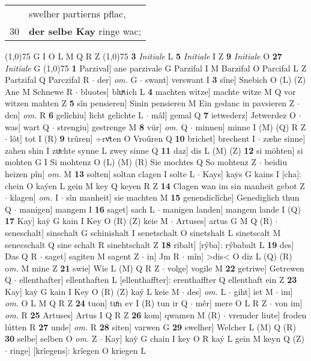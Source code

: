 \documentclass[8pt,a4paper,notitlepage]{article}
\begin{document}
\begin{table}[ht]
\begin{minipage}[t]{0.5\linewidth}
\begin{tabular}{rl}
 & swelher partierns pflac,\\ 
30 & \textbf{der selbe Kay} ringe wac;\\ 
\end{tabular}
\scriptsize
\line(1,0){75} \newline
G I O L M Q R Z \newline
\line(1,0){75} \newline
\textbf{3} \textit{Initiale} L  \textbf{5} \textit{Initiale} I Z  \textbf{9} \textit{Initiale} O  \textbf{27} \textit{Initiale} G  \newline
\line(1,0){75} \newline
\textbf{1} Parzival] ane parzivale G Parzifal I M Barzifal O Parcifal L Z Partzifal Q Parczifal R  $\cdot$ der] \textit{om.} G  $\cdot$ swant] verswant I \textbf{3} sîne] Snebich O (L) (Z) Ane M Schnewe R  $\cdot$ bluotes] bluͯtich L \textbf{4} machten witze] machte witze M Q vor witzen mahten Z \textbf{5} sîn pensieren] Sinin pensieren M Ein gedanc in pavsieren Z  $\cdot$ den] \textit{om.} R \textbf{6} gelîchiu] licht gelichte L  $\cdot$ mâl] gemal Q \textbf{7} ietwederz] Jetwerdez O  $\cdot$ was] wart Q  $\cdot$ strengiu] gestrenge M \textbf{8} vür] \textit{om.} Q  $\cdot$ minnen] minne I (M) (Q) R Z  $\cdot$ lôt] tot I (R) \textbf{9} trûren] ÷rvͤten O Vroűren Q \textbf{10} brichet] brechent I  $\cdot$ zæhe sinne] zahen shin I zuͯchte synne L zwey sinne Q \textbf{11} daz] dis L (M) (Z) \textbf{12} si möhten] si mohten G I Si mohtenz O (L) (M) (R) Sie mochtes Q So mohtenz Z  $\cdot$ beidiu heizen pîn] \textit{om.} M \textbf{13} solten] soltan clagen I solte L  $\cdot$ Kays] kaẏs G kains I [cha]: chein O kaýen L gein M key Q keyen R Z \textbf{14} Clagen wan im sin manheit gebot Z  $\cdot$ klagen] \textit{om.} I  $\cdot$ sîn manheit] sie machten M \textbf{15} genendiclîche] Genediglich thun Q  $\cdot$ manigen] mangem I \textbf{16} saget] sach L  $\cdot$ manigen landen] mangem lande I (Q) \textbf{17} Kay] kaẏ G kain I Key O (R) (Z) keie M  $\cdot$ Artuses] artus G M Q (R)  $\cdot$ seneschalt] sinschalt G schinishalt I senetschalt O sinetshalt L sinetscalt M senecschalt Q sine schalt R sinehtschalt Z \textbf{18} ribalt] [rýba]: rýbabalt L \textbf{19} des] Das Q R  $\cdot$ saget] sagiten M sagent Z  $\cdot$ in] Jm R  $\cdot$ mîn] >dis< O diz L (Q) (R) o\textit{m. } M mine Z \textbf{21} swie] Wie L (M) Q R Z  $\cdot$ volge] vogile M \textbf{22} getriwe] Getrewen Q  $\cdot$ ellenthafter] ellenthaften L [ellenthaffter]: erenthaffter Q ellenthaft ein Z \textbf{23} Kay] kaẏ G kain I Key O (R) (Z) kaý L keie M  $\cdot$ des] \textit{om.} L  $\cdot$ giht] iet M  $\cdot$ im] \textit{om.} O L M Q R Z \textbf{24} tuon] tuͤn ev I (R) tun ir Q  $\cdot$ mêr] mere O L R Z  $\cdot$ von im] \textit{om.} R \textbf{25} Artuses] Artus I Q R Z \textbf{26} kom] qwamen M (R)  $\cdot$ vremder liute] froden lútten R \textbf{27} unde] \textit{om.} R \textbf{28} siten] varwen G \textbf{29} swelher] Welcher L (M) Q (R) \textbf{30} selbe] selben O \textit{om.} Z  $\cdot$ Kay] kaẏ G chain I key O R kaý L gein M keyn Q (Z)  $\cdot$ ringe] [krîegens]: krîegen O kriegen L \newline

\end{minipage}
\end{table}
\end{document}
